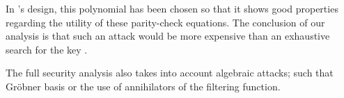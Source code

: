 In \coolName's design, this polynomial has been chosen so that it shows good properties regarding the utility of these parity-check equations. The conclusion of our analysis is that such an attack would be more expensive than an exhaustive search for the key .


\medskip

The full security analysis also takes into account algebraic attacks; such that Gröbner basis or the use of annihilators of the filtering function.